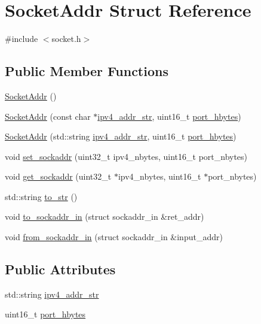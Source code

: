 \hypertarget{structSocketAddr}{}\section{Socket\+Addr Struct Reference}
\label{structSocketAddr}


{\ttfamily \#include $<$socket.\+h$>$}

\subsection*{Public Member Functions}
\begin{DoxyCompactItemize}
\item 
\hyperlink{structSocketAddr_ac9fe40eadabc57b45f5ceb3aca715e22}{Socket\+Addr} ()
\item 
\hyperlink{structSocketAddr_a6d4f15342cb86647916a0741836e1c5f}{Socket\+Addr} (const char $\ast$\hyperlink{structSocketAddr_a973e725fb7a3fb1e92d97da9e89a1fe1}{ipv4\+\_\+addr\+\_\+str}, uint16\+\_\+t \hyperlink{structSocketAddr_aabf22ab371acc5bc2de3d32b135a8911}{port\+\_\+hbytes})
\item 
\hyperlink{structSocketAddr_aeba8b0a03790689aad646b67a0cb4c60}{Socket\+Addr} (std\+::string \hyperlink{structSocketAddr_a973e725fb7a3fb1e92d97da9e89a1fe1}{ipv4\+\_\+addr\+\_\+str}, uint16\+\_\+t \hyperlink{structSocketAddr_aabf22ab371acc5bc2de3d32b135a8911}{port\+\_\+hbytes})
\item 
void \hyperlink{structSocketAddr_a0237a249a1248ae4e9cf23d64a4d79be}{set\+\_\+sockaddr} (uint32\+\_\+t ipv4\+\_\+nbytes, uint16\+\_\+t port\+\_\+nbytes)
\item 
void \hyperlink{structSocketAddr_aa30057516c12c8e7f0292e15027dd7ae}{get\+\_\+sockaddr} (uint32\+\_\+t $\ast$ipv4\+\_\+nbytes, uint16\+\_\+t $\ast$port\+\_\+nbytes)
\item 
std\+::string \hyperlink{structSocketAddr_ad3130ceab48fa13e6891b4ee757f80a3}{to\+\_\+str} ()
\item 
void \hyperlink{structSocketAddr_a3f9dfb07ec251c054b63d8f006400b09}{to\+\_\+sockaddr\+\_\+in} (struct sockaddr\+\_\+in \&ret\+\_\+addr)
\item 
void \hyperlink{structSocketAddr_a8ebe782431afe45d88532c153d13192f}{from\+\_\+sockaddr\+\_\+in} (struct sockaddr\+\_\+in \&input\+\_\+addr)
\end{DoxyCompactItemize}
\subsection*{Public Attributes}
\begin{DoxyCompactItemize}
\item 
std\+::string \hyperlink{structSocketAddr_a973e725fb7a3fb1e92d97da9e89a1fe1}{ipv4\+\_\+addr\+\_\+str}
\item 
uint16\+\_\+t \hyperlink{structSocketAddr_aabf22ab371acc5bc2de3d32b135a8911}{port\+\_\+hbytes}
\end{DoxyCompactItemize}


